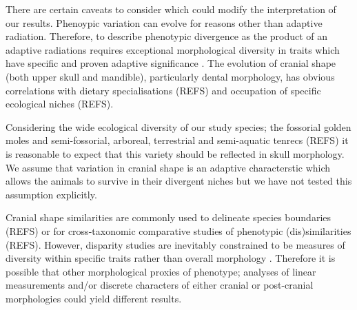 \documentclass[12pt,a4paper]{article}
\begin{document}
	




	There are certain caveats to consider which could modify the interpretation of our results.
	Phenoypic variation can evolve for reasons other than adaptive radiation. Therefore, to describe phenotypic divergence as the product of an adaptive radiations requires exceptional morphological diversity in traits which have specific and proven adaptive significance \citep{Losos2010a}. The evolution of cranial shape (both upper skull and mandible), particularly dental morphology, has obvious correlations with dietary specialisations (REFS) and occupation of specific ecological niches (REFS). %

	Considering the wide ecological diversity of our study species; the fossorial golden moles and semi-fossorial, arboreal, terrestrial and semi-aquatic tenrecs (REFS) it is reasonable to expect that this variety should be reflected in skull morphology.
	We assume that variation in cranial shape is an adaptive characterstic which allows the animals to survive in their divergent niches but we have not tested this assumption explicitly. 


	Cranial shape similarities are commonly used to delineate species boundaries (REFS) or for cross-taxonomic comparative studies of phenotypic (dis)similarities (REFS). However, disparity studies are inevitably constrained to be measures of diversity within specific traits rather than overall morphology \citep{Roy1997}. Therefore it is possible that other morphological proxies of phenotype; analyses of linear measurements and/or discrete characters of either cranial or post-cranial morphologies could yield different results. 
\end{document}
